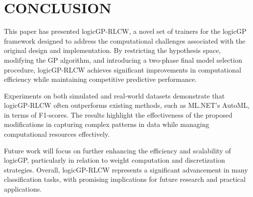 \documentclass[a4paper,twoside]{article}
\begin{document}
\section{\uppercase{Conclusion}}\label{sec:conclusion}

This paper has presented logicGP-RLCW, a novel set of trainers for the logicGP framework designed to address the computational challenges associated with the original design and implementation. By restricting the hypothesis space, modifying the GP algorithm, and introducing a two-phase final model selection procedure, logicGP-RLCW achieves significant improvements in computational efficiency while maintaining competitive predictive performance.

Experiments on both simulated and real-world datasets demonstrate that logicGP-RLCW often outperforms existing methods, such as ML.NET's AutoML, in terms of F1-scores. The results highlight the effectiveness of the proposed modifications in capturing complex patterns in data while managing computational resources effectively.

Future work will focus on further enhancing the efficiency and scalability of logicGP, particularly in relation to weight computation and discretization strategies. Overall, logicGP-RLCW represents a significant advancement in many classification tasks, with promising implications for future research and practical applications. 


 
\end{document}
